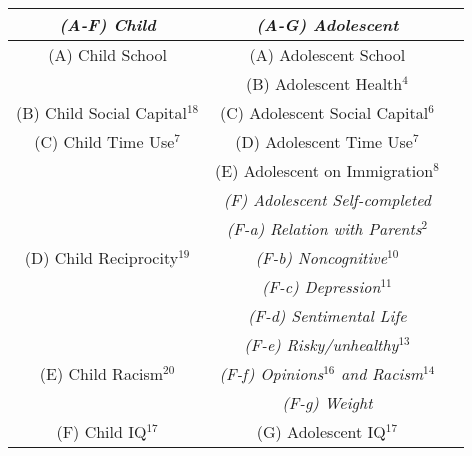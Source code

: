 \begin{table}
\begin{center}
\begin{tabular}{ c c c }
\textbf{\textit{(A-F) Child}} & \textbf{\textit{(A-G) Adolescent}} & \\
\hline
(A) Child School & (A) Adolescent School & \\
 & (B) Adolescent Health$^{4}$ & \\
(B) Child Social Capital$^{18}$ & (C) Adolescent Social Capital$^{6}$ & \\
(C) Child Time Use$^{7}$ & (D) Adolescent Time Use$^{7}$ & \\
 & (E) Adolescent on Immigration$^{8}$ & \\
 & \textit{(F) Adolescent Self-completed} & \\
 & \textit{(F-a) Relation with Parents$^{2}$} & \\
(D) Child Reciprocity$^{19}$ & \textit{(F-b) Noncognitive$^{10}$} & \\
 & \textit{(F-c) Depression$^{11}$} & \\
 & \textit{(F-d) Sentimental Life} & \\
 & \textit{(F-e) Risky/unhealthy$^{13}$} & \\
(E) Child Racism$^{20}$ & \textit{(F-f) Opinions$^{16}$ and Racism$^{14}$} & \\
 & \textit{(F-g) Weight} & \\
(F) Child IQ$^{17}$ & (G) Adolescent IQ$^{17}$ &  \\
\hline
\end{tabular}
\end{center}

\end{table}
